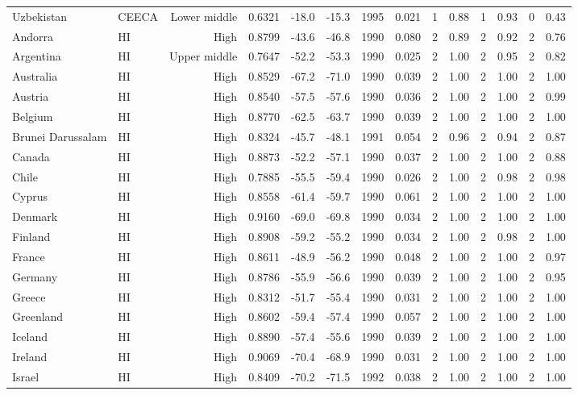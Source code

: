 \begin{longtable}{llrrrrrrrrrrrr}
Uzbekistan & CEECA & Lower middle & 0.6321 & -18.0 & -15.3 & 1995 & 0.021 & 1 & 0.88 & 1 & 0.93 & 0 & 0.43 \\
Andorra & HI & High & 0.8799 & -43.6 & -46.8 & 1990 & 0.080 & 2 & 0.89 & 2 & 0.92 & 2 & 0.76 \\
Argentina & HI & Upper middle & 0.7647 & -52.2 & -53.3 & 1990 & 0.025 & 2 & 1.00 & 2 & 0.95 & 2 & 0.82 \\
Australia & HI & High & 0.8529 & -67.2 & -71.0 & 1990 & 0.039 & 2 & 1.00 & 2 & 1.00 & 2 & 1.00 \\
Austria & HI & High & 0.8540 & -57.5 & -57.6 & 1990 & 0.036 & 2 & 1.00 & 2 & 1.00 & 2 & 0.99 \\
Belgium & HI & High & 0.8770 & -62.5 & -63.7 & 1990 & 0.039 & 2 & 1.00 & 2 & 1.00 & 2 & 1.00 \\
Brunei Darussalam & HI & High & 0.8324 & -45.7 & -48.1 & 1991 & 0.054 & 2 & 0.96 & 2 & 0.94 & 2 & 0.87 \\
Canada & HI & High & 0.8873 & -52.2 & -57.1 & 1990 & 0.037 & 2 & 1.00 & 2 & 1.00 & 2 & 0.88 \\
Chile & HI & High & 0.7885 & -55.5 & -59.4 & 1990 & 0.026 & 2 & 1.00 & 2 & 0.98 & 2 & 0.98 \\
Cyprus & HI & High & 0.8558 & -61.4 & -59.7 & 1990 & 0.061 & 2 & 1.00 & 2 & 1.00 & 2 & 1.00 \\
Denmark & HI & High & 0.9160 & -69.0 & -69.8 & 1990 & 0.034 & 2 & 1.00 & 2 & 1.00 & 2 & 1.00 \\
Finland & HI & High & 0.8908 & -59.2 & -55.2 & 1990 & 0.034 & 2 & 1.00 & 2 & 0.98 & 2 & 1.00 \\
France & HI & High & 0.8611 & -48.9 & -56.2 & 1990 & 0.048 & 2 & 1.00 & 2 & 1.00 & 2 & 0.97 \\
Germany & HI & High & 0.8786 & -55.9 & -56.6 & 1990 & 0.039 & 2 & 1.00 & 2 & 1.00 & 2 & 0.95 \\
Greece & HI & High & 0.8312 & -51.7 & -55.4 & 1990 & 0.031 & 2 & 1.00 & 2 & 1.00 & 2 & 1.00 \\
Greenland & HI & High & 0.8602 & -59.4 & -57.4 & 1990 & 0.057 & 2 & 1.00 & 2 & 1.00 & 2 & 1.00 \\
Iceland & HI & High & 0.8890 & -57.4 & -55.6 & 1990 & 0.039 & 2 & 1.00 & 2 & 1.00 & 2 & 1.00 \\
Ireland & HI & High & 0.9069 & -70.4 & -68.9 & 1990 & 0.031 & 2 & 1.00 & 2 & 1.00 & 2 & 1.00 \\
Israel & HI & High & 0.8409 & -70.2 & -71.5 & 1992 & 0.038 & 2 & 1.00 & 2 & 1.00 & 2 & 1.00 \\

\end{longtable}

